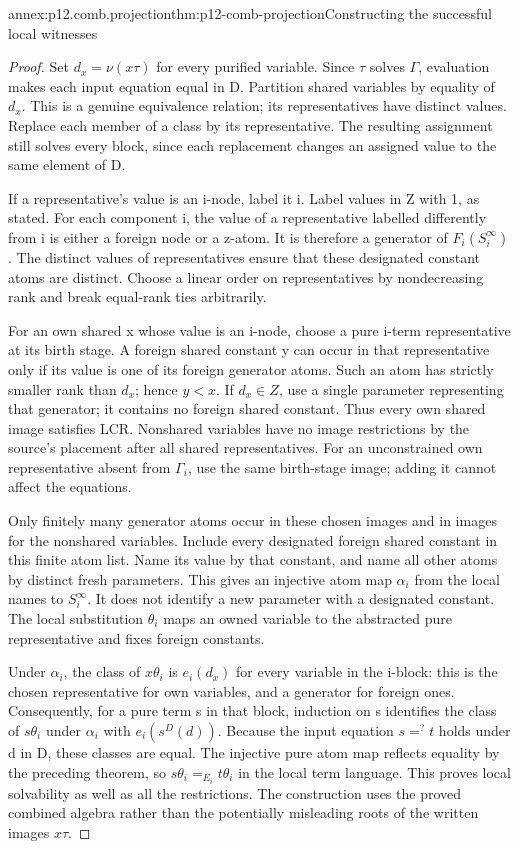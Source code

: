 \begin{annexitem}{annex:p12.comb.projection}{thm:p12-comb-projection}{Constructing the successful local witnesses}
\begin{proof}
Set \(d_x=\nu(x\tau)\) for every purified variable. Since \(\tau\)
solves \(\Gamma\), evaluation makes each input equation equal in D.
Partition shared variables by equality of \(d_x\). This is a
genuine equivalence relation; its representatives have distinct
values. Replace each member of a class by its representative.
The resulting assignment still solves every block, since each
replacement changes an assigned value to the same element of D.

If a representative's value is an i-node, label it i. Label values
in Z with 1, as stated. For each component i, the value of a
representative labelled differently from i is either a foreign node
or a z-atom. It is therefore a generator of \(F_i(S_i^\infty)\).
The distinct values of representatives ensure that these designated
constant atoms are distinct. Choose a linear order on representatives
by nondecreasing rank and break equal-rank ties arbitrarily.

For an own shared x whose value is an i-node, choose a pure i-term
representative at its birth stage. A foreign shared constant y can
occur in that representative only if its value is one of its
foreign generator atoms. Such an atom has strictly smaller rank
than \(d_x\); hence \(y<x\). If \(d_x\in Z\), use a single
parameter representing that generator; it contains no foreign
shared constant. Thus every own shared image satisfies LCR.
Nonshared variables have no image restrictions by the source's
placement after all shared representatives. For an unconstrained
own representative absent from \(\Gamma_i\), use the same birth-stage
image; adding it cannot affect the equations.

Only finitely many generator atoms occur in these chosen images
and in images for the nonshared variables. Include every designated
foreign shared constant in this finite atom list. Name its value by
that constant, and name all other atoms by distinct fresh parameters.
This gives an injective atom map \(\alpha_i\) from the local names
to \(S_i^\infty\). It does not identify a new parameter with a
designated constant. The local substitution \(\theta_i\) maps an
owned variable to the abstracted pure representative and fixes
foreign constants.

Under \(\alpha_i\), the class of \(x\theta_i\) is
\(e_i(d_x)\) for every variable in the i-block: this is the chosen
representative for own variables, and a generator for foreign ones.
Consequently, for a pure term s in that block, induction on s
identifies the class of \(s\theta_i\) under \(\alpha_i\) with
\(e_i(s^D(d))\). Because the input equation \(s=^{?}t\) holds
under d in D, these classes are equal. The injective pure atom
map reflects equality by the preceding theorem, so
\(s\theta_i=_{E_i}t\theta_i\) in the local term language.
This proves local solvability as well as all the restrictions.
The construction uses the proved combined algebra rather than
the potentially misleading roots of the written images \(x\tau\).
\end{proof}
\end{annexitem}

